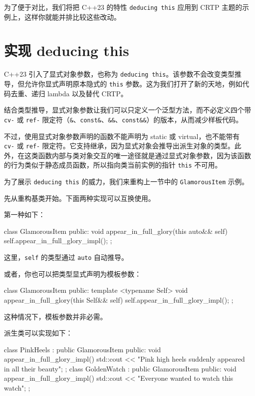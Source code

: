 为了便于对比，我们将把 C++23 的特性 \texttt{deducing this} 应用到 CRTP 主题的示例上，这样你就能并排比较这些改动。

\section{实现 deducing this}

\label{idx:560}
C++23 引入了显式对象参数，也称为 \texttt{deducing this}。该参数不会改变类型推导，但允许你显式声明原本隐式的 \texttt{this} 参数。这为我们打开了新的天地，例如代码去重、递归 lambda 以及替代 CRTP。

结合类型推导，显式对象参数让我们可以只定义一个泛型方法，而不必定义四个带 \texttt{cv-} 或 \texttt{ref-} 限定符（\texttt{\&}、\texttt{const\&}、\texttt{\&\&}、\texttt{const\&\&}）的版本，从而减少样板代码。

不过，使用显式对象参数声明的函数不能声明为 static 或 virtual，也不能带有 \texttt{cv-} 或 \texttt{ref-} 限定符。它支持继承，因为显式对象会推导出派生对象的类型。此外，在这类函数内部与类对象交互的唯一途径就是通过显式对象参数，因为该函数的行为类似于静态成员函数，所以指向类当前实例的指针 \texttt{this} 不可用。

为了展示 \texttt{deducing this} 的威力，我们来重构上一节中的 \texttt{Glamorous\allowbreak{}Item} 示例。

\label{idx:561}
先从重构基类开始。下面两种实现可以互换使用。

第一种如下：

\begin{codebox}[cpp]
class GlamorousItem {
public:
    void appear_in_full_glory(this auto&& self) { self.appear_in_full_glory_impl();
    }
};
\end{codebox}

这里，\texttt{self} 的类型通过 \texttt{auto} 自动推导。

或者，你也可以把类型显式声明为模板参数：

\begin{codebox}[cpp]
class GlamorousItem {
public:
    template <typename Self>
    void appear_in_full_glory(this Self&& self) {
        self.appear_in_full_glory_impl();
    }
};
\end{codebox}

这种情况下，模板参数并非必需。

派生类可以实现如下：

\begin{codebox}[cpp]
class PinkHeels : public GlamorousItem {
public:
    void appear_in_full_glory_impl() {
        std::cout << "Pink high heels suddenly appeared in all their beauty\n";
    }
};
class GoldenWatch : public GlamorousItem {
public:
    void appear_in_full_glory_impl() {
        std::cout << "Everyone wanted to watch this watch\n";
    }
};
\end{codebox}

